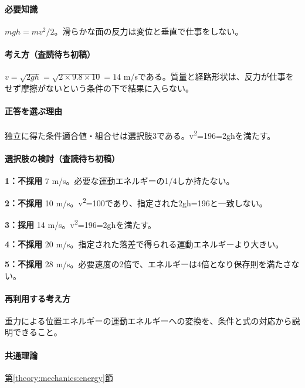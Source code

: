 \paragraph{必要知識} \(mgh=mv^2/2\)。滑らかな面の反力は変位と垂直で仕事をしない。

\paragraph{考え方（査読待ち初稿）} \(v=\sqrt{2gh}=\sqrt{2\times9.8\times10}=14\) m/sである。質量と経路形状は、反力が仕事をせず摩擦がないという条件の下で結果に入らない。

\paragraph{正答を選ぶ理由} 独立に得た条件適合値・組合せは選択肢3である。v\textsuperscript{2}=196=\allowbreak{}2ghを満たす。

\paragraph{選択肢の検討（査読待ち初稿）}\mbox{}\par

\noindent\textbf{1：不採用} 7 m/s。必要な運動エネルギーの1/4しか持たない。\par

\noindent\textbf{2：不採用} 10 m/s。v\textsuperscript{2}=100であり、指定された2gh=\allowbreak{}196と一致しない。\par

\noindent\textbf{3：採用} 14 m/s。v\textsuperscript{2}=196=\allowbreak{}2ghを満たす。\par

\noindent\textbf{4：不採用} 20 m/s。指定された落差で得られる運動エネルギーより大きい。\par

\noindent\textbf{5：不採用} 28 m/s。必要速度の2倍で、エネルギーは4倍となり保存則を満たさない。\par

\paragraph{再利用する考え方} 重力による位置エネルギーの運動エネルギーへの変換を、条件と式の対応から説明できること。

\paragraph{共通理論} \hyperref[theory:mechanics:energy]{第\ref*{theory:mechanics:energy}節}

